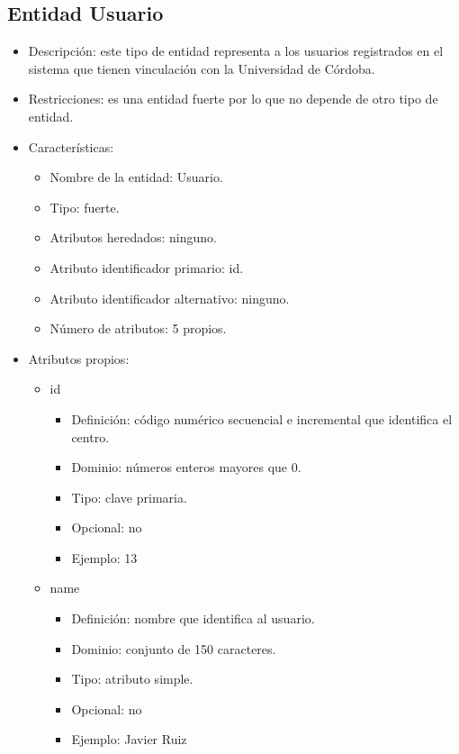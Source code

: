 \subsection{Entidad Usuario}
\begin{itemize}
    \item Descripción: este tipo de entidad representa a los usuarios registrados en el sistema que tienen vinculación con la Universidad de Córdoba.
    \item Restricciones: es una entidad fuerte por lo que no depende de otro tipo de entidad.
    \item Características:
    \begin{itemize}
        \item Nombre de la entidad: Usuario.
        \item Tipo: fuerte.
        \item Atributos heredados: ninguno.
        \item Atributo identificador primario: id.
        \item Atributo identificador alternativo: ninguno.
        \item Número de atributos: 5 propios.
    \end{itemize}

    \item Atributos propios:
    \begin{itemize}
        \item id
        \begin{itemize}
            \item Definición: código numérico secuencial e incremental que identifica el centro.
            \item Dominio: números enteros mayores que 0.
            \item Tipo: clave primaria.
            \item Opcional: no
            \item Ejemplo: 13
        \end{itemize}

        \item name
        \begin{itemize}
            \item Definición: nombre que identifica al usuario.
            \item Dominio: conjunto de 150 caracteres.
            \item Tipo: atributo simple.
            \item Opcional: no
            \item Ejemplo: Javier Ruiz
        \end{itemize}


\end{itemize}
\end{itemize}
